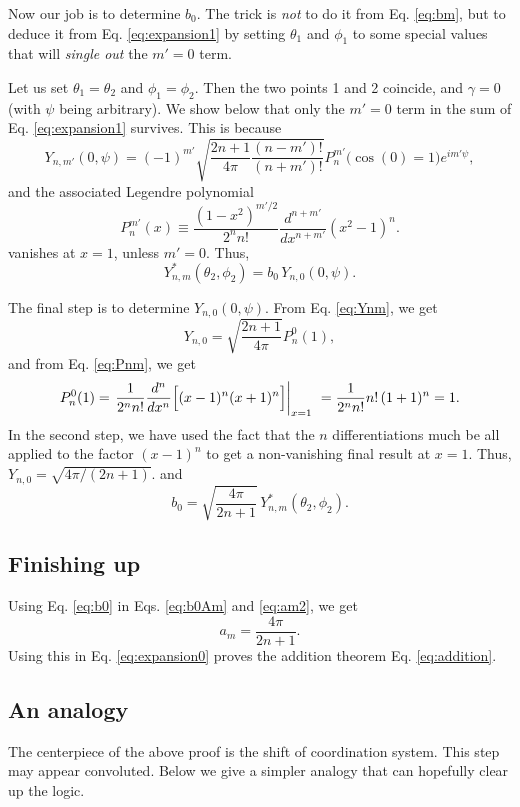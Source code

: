\documentclass[11pt]{article}
\begin{document}
Now our job is to determine $b_0$.
The trick is \emph{not} to do it from Eq. \eqref{eq:bm},
but to deduce it from Eq. \eqref{eq:expansion1}
by setting $\theta_1$ and $\phi_1$ to some special values
that will \emph{single out} the $m' = 0$ term.

Let us set $\theta_1 = \theta_2$ and $\phi_1 = \phi_2$.
Then the two points 1 and 2 coincide,
and $\gamma = 0$ (with $\psi$ being arbitrary).
%
We show below that only the $m' = 0$ term in the sum
of Eq. \eqref{eq:expansion1} survives.
%
This is because
\begin{equation}
  Y_{n, m'}(0, \psi)
=
  (-1)^{m'}
  \sqrt{
    \frac{ 2 n + 1 } { 4 \pi }
    \frac{ (n - m')! } { (n + m')! }
  }
  P_{n}^{m'}\bigl( \cos(0) = 1 \bigr) e^{i m' \psi},
  \label{eq:Ynm}
\end{equation}
and the associated Legendre polynomial
\begin{equation}
  P_{n}^{m'}(x)
\equiv
  \frac{ (1 - x^2)^{m'/2} } { 2^{n} n! }
  \frac{ d^{n+m'} } { d x^{n+m'} } (x^2 - 1)^{n}.
  \label{eq:Pnm}
\end{equation}
vanishes at $x = 1$, unless $m' = 0$.
Thus,
\[
Y_{n,m}^*(\theta_2, \phi_2)
=
b_0 \, Y_{n, 0}(0, \psi).
\]

The final step is to determine $Y_{n, 0}(0, \psi)$.
From Eq. \eqref{eq:Ynm}, we get
\[
  Y_{n, 0}
=
  \sqrt{
    \frac { 2 n + 1 } { 4 \pi }
  }
  P_{n}^0(1),
\]
and
from Eq. \eqref{eq:Pnm}, we get
\[
  P_{n}^{0}(1)
=
  \left.
  \frac{ 1 } { 2^{n} n! }
  \frac{ d^{n} } { d x^{n} }
  \Bigl[
    (x - 1)^{n}
    (x + 1)^{n}
  \Bigr]
  \right|_{x = 1}\
= \frac{ 1 } { 2^{n} n! }
  n! \, (1 + 1)^n
= 1.
\]
In the second step,
we have used the fact that
the $n$ differentiations much
be all applied to the factor $(x - 1)^n$
to get a non-vanishing final result at $x = 1$.
%
Thus,
$Y_{n, 0} = \sqrt{4\pi/(2n+1)}$.
and
\begin{equation}
b_0 = \sqrt{ \frac {4 \pi} { 2 n + 1 } } \, Y_{n,m}^*(\theta_2, \phi_2).
\label{eq:b0}
\end{equation}


\subsection{Finishing up}

Using Eq. \eqref{eq:b0} in Eqs. \eqref{eq:b0Am} and \eqref{eq:am2},
we get
\begin{equation}
  a_m = \frac{ 4 \pi } { 2 n + 1 }.
\end{equation}
Using this in Eq. \eqref{eq:expansion0}
proves the addition theorem Eq. \eqref{eq:addition}.




\subsection{An analogy}



The centerpiece of the above proof is the shift of coordination system.
This step may appear convoluted.
Below we give a simpler analogy
that can hopefully clear up the logic.
\end{document}
